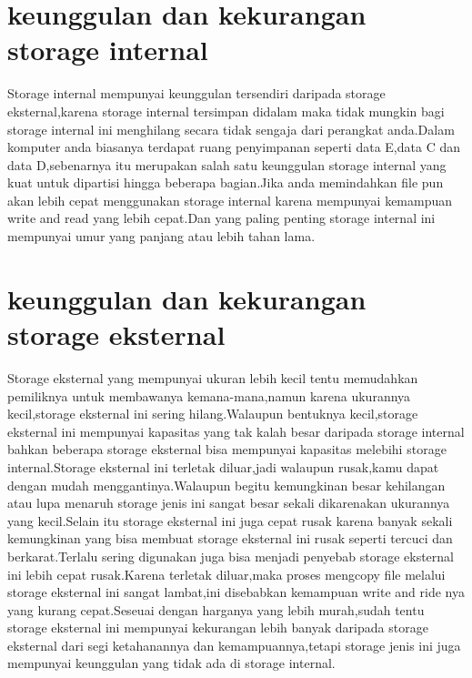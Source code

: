 \section{keunggulan dan kekurangan storage internal}

Storage internal mempunyai keunggulan tersendiri daripada storage eksternal,karena storage internal tersimpan didalam maka tidak mungkin bagi storage internal ini menghilang secara tidak sengaja dari perangkat anda.Dalam komputer anda biasanya terdapat ruang penyimpanan seperti data E,data C dan data D,sebenarnya itu merupakan salah satu keunggulan storage internal yang kuat untuk dipartisi hingga beberapa bagian.Jika anda memindahkan file pun akan lebih cepat menggunakan storage internal karena mempunyai kemampuan write and read yang lebih cepat.Dan yang paling penting storage internal ini mempunyai umur yang panjang atau lebih tahan lama.

\section{keunggulan dan kekurangan storage eksternal}

Storage eksternal yang mempunyai ukuran lebih kecil tentu memudahkan pemiliknya untuk membawanya kemana-mana,namun karena ukurannya kecil,storage eksternal ini sering hilang.Walaupun bentuknya kecil,storage eksternal ini mempunyai kapasitas yang tak kalah besar daripada storage internal bahkan beberapa storage eksternal bisa mempunyai kapasitas melebihi storage internal.Storage eksternal ini terletak diluar,jadi walaupun rusak,kamu dapat dengan mudah menggantinya.Walaupun begitu kemungkinan besar kehilangan atau lupa menaruh storage jenis ini sangat besar sekali dikarenakan ukurannya yang kecil.Selain itu storage eksternal ini juga cepat rusak karena banyak sekali kemungkinan yang bisa membuat storage eksternal ini rusak seperti tercuci dan berkarat.Terlalu sering digunakan juga bisa menjadi penyebab storage eksternal ini lebih cepat rusak.Karena terletak diluar,maka proses mengcopy file melalui storage eksternal ini sangat lambat,ini disebabkan kemampuan write and ride nya yang kurang cepat.Seseuai dengan harganya yang lebih murah,sudah tentu storage eksternal ini mempunyai kekurangan lebih banyak daripada storage eksternal dari segi ketahanannya dan kemampuannya,tetapi storage jenis ini juga mempunyai keunggulan yang tidak ada di storage internal. 


